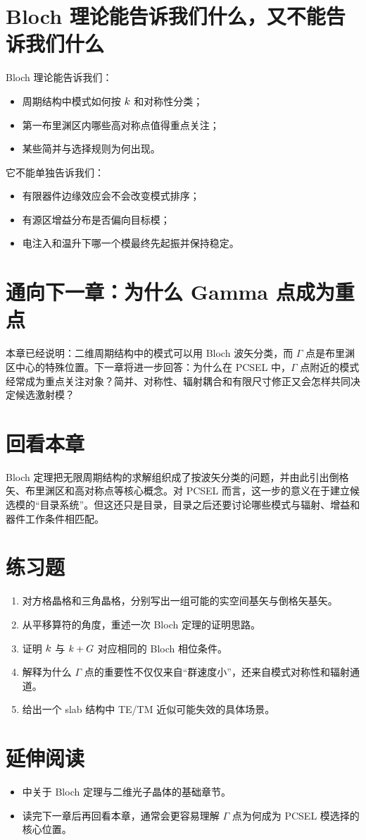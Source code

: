 \section{Bloch 理论能告诉我们什么，又不能告诉我们什么}
Bloch 理论能告诉我们：
\begin{itemize}
  \item 周期结构中模式如何按 $k$ 和对称性分类；
  \item 第一布里渊区内哪些高对称点值得重点关注；
  \item 某些简并与选择规则为何出现。
\end{itemize}

它不能单独告诉我们：
\begin{itemize}
  \item 有限器件边缘效应会不会改变模式排序；
  \item 有源区增益分布是否偏向目标模；
  \item 电注入和温升下哪一个模最终先起振并保持稳定。
\end{itemize}

\section{通向下一章：为什么 Gamma 点成为重点}
本章已经说明：二维周期结构中的模式可以用 Bloch 波矢分类，而 $\Gamma$ 点是布里渊区中心的特殊位置。下一章将进一步回答：为什么在 PCSEL 中，$\Gamma$ 点附近的模式经常成为重点关注对象？简并、对称性、辐射耦合和有限尺寸修正又会怎样共同决定候选激射模？

\section*{回看本章}
Bloch 定理把无限周期结构的求解组织成了按波矢分类的问题，并由此引出倒格矢、布里渊区和高对称点等核心概念。对 PCSEL 而言，这一步的意义在于建立候选模的“目录系统”。但这还只是目录，目录之后还要讨论哪些模式与辐射、增益和器件工作条件相匹配。

\section*{练习题}
\begin{enumerate}
  \item \basicq 对方格晶格和三角晶格，分别写出一组可能的实空间基矢与倒格矢基矢。

  \item \basicq 从平移算符的角度，重述一次 Bloch 定理的证明思路。

  \item \basicq 证明 $k$ 与 $k+G$ 对应相同的 Bloch 相位条件。

  \item \midq 解释为什么 $\Gamma$ 点的重要性不仅仅来自“群速度小”，还来自模式对称性和辐射通道。

  \item \hardq 给出一个 slab 结构中 TE/TM 近似可能失效的具体场景。
\end{enumerate}

\section*{延伸阅读}
\begin{itemize}
  \item \cite{joannopoulos2008,sakoda2005} 中关于 Bloch 定理与二维光子晶体的基础章节。

  \item 读完下一章后再回看本章，通常会更容易理解 $\Gamma$ 点为何成为 PCSEL 模选择的核心位置。
\end{itemize}
